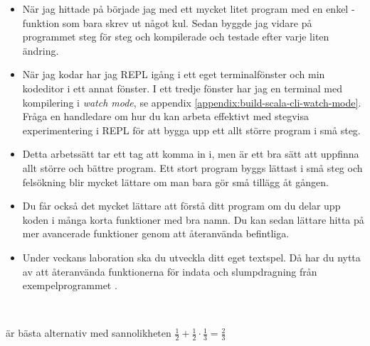 \begin{itemize}[nolistsep]
  \item När jag hittade på  började jag med ett mycket litet program med en enkel -funktion som bara skrev ut något kul. Sedan byggde jag vidare på programmet steg för steg och kompilerade och testade efter varje liten ändring.

  \item När jag kodar har jag REPL igång i ett eget terminalfönster och min kodeditor i ett annat fönster. I ett tredje fönster har jag en terminal med kompilering i \textit{watch mode}, se appendix \ref{appendix:build-scala-cli-watch-mode}. Fråga en handledare om hur du kan arbeta effektivt med stegvisa experimentering i REPL för att bygga upp ett allt större program i små steg.

  \item Detta arbetssätt tar ett tag att komma in i, men är ett bra sätt att uppfinna allt större och bättre program. Ett stort program byggs lättast i små steg och felsökning blir mycket lättare om man bara gör små tillägg åt gången.

  \item Du får också det mycket lättare att förstå ditt program om du delar upp koden i många korta funktioner med bra namn. Du kan sedan lättare hitta på mer avancerade funktioner genom att återanvända befintliga.

  \item Under veckans laboration ska du utveckla ditt eget textspel. Då har du nytta av att återanvända funktionerna för indata och slumpdragning från exempelprogrammet .
\end{itemize}



\SOLUTION

\TaskSolved \what~

\SubtaskSolved {} är bästa alternativ med sannolikheten $\frac{1}{2} + \frac{1}{2}\cdot\frac{1}{3} = \frac{2}{3}$

\SubtaskSolved

\begin{ConceptConnections}
  
\end{ConceptConnections}

\QUESTEND




